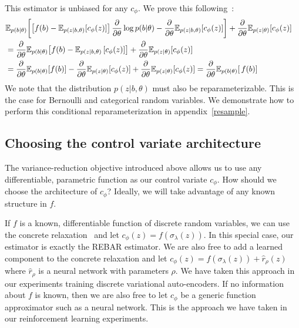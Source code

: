\documentclass{article}
\newcommand{\discreteDist}{p(b|\theta)}
\newcommand{\loss}{f(b)}
\newcommand{\expectedLoss}{\mathbb{E}_{\discreteDist{}} \! \left[ \, \loss{} \right]}
\newcommand{\E}{\mathbb{E}}
\newcommand{\PT}{\frac{\partial}{\partial \theta}}
\begin{document}
This estimator is unbiased for any $c_\phi$.
We prove this following~\cite{tucker2017rebar}:
%
\begin{align}
\E_{p(b|\theta)} \! \left[\left[ f(b) - \E_{p(z|b, \theta)} \! \left[c_\phi(z) \right] \right]\PT \log p(b|\theta)  - \PT \E_{p(z|b, \theta)} \! \left[c_\phi(z) \right] \right] + \PT\E_{p(z|\theta)} \! \left[ c_\phi(z) \right] \span & \nonumber\\
&= \PT \E_{p(b|\theta)} \! \left[ f(b) - \E_{p(z|b, \theta)}\left[ c_\phi(z) \right]  \right] + \PT\E_{p(z|\theta)} \! \left[ c_\phi(z) \right]\nonumber\\
&= \PT \E_{p(b|\theta)} \! \left[ f(b) \right] - \PT\E_{p(z|\theta)} \! \left[ c_\phi(z) \right] + \PT\E_{p(z|\theta)} \! \left[ c_\phi(z) \right]
= \PT \expectedLoss{}%
\end{align}
%
We note that the distribution $p(z|b,\theta)$ must also be reparameterizable.
This is the case for Bernoulli and categorical random variables.
We demonstrate how to perform this conditional reparameterization in appendix~\ref{resample}.

\subsection{Choosing the control variate architecture}
The variance-reduction objective introduced above allows us to use any differentiable, parametric function as our control variate $c_\phi$. 
How should we choose the architecture of $c_\phi$?
Ideally, we will take advantage of any known structure in $f$.

If $f$ is a known, differentiable function of discrete random variables, we can use the concrete relaxation~\cite{maddison2016concrete} and let $c_\phi(z) = f(\sigma_\lambda(z))$.
In this special case, our estimator is exactly the REBAR estimator.
We are also free to add a learned component to the concrete relaxation and let $c_\phi(z) = f(\sigma_\lambda(z)) + \hat{r}_\rho(z)$ where $\hat{r}_\rho$ is a neural network with parameters $\rho$.
We have taken this approach in our experiments training discrete variational auto-encoders.
If no information about $f$ is known, then we are also free to let $c_\phi$ be a generic function approximator such as a neural network.
This is the approach we have taken in our reinforcement learning experiments.
\end{document}
